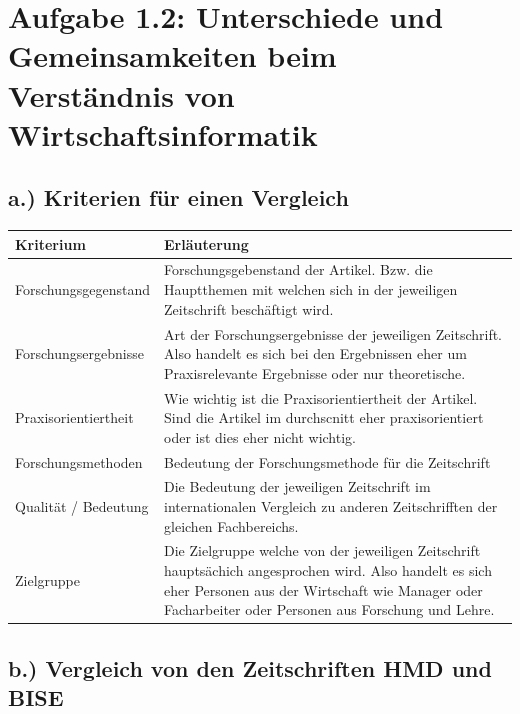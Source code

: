 \documentclass[12pt,utf8]{scrartcl}
\begin{document}
\section{\label{sec:einfuehrung}Aufgabe 1.2: Unterschiede und Gemeinsamkeiten beim Verständnis von Wirtschaftsinformatik}
\subsection{\label{sub:einfuehrung}a.) Kriterien für einen Vergleich}

\begin{tabular}{|p{5cm}|p{10cm}|}
\hline
Kriterium & Erläuterung \\
\hline
Forschungsgegenstand & Forschungsgebenstand der Artikel. Bzw. die Hauptthemen mit welchen sich in der jeweiligen Zeitschrift beschäftigt wird.\\
\hline
Forschungsergebnisse & Art der Forschungsergebnisse der jeweiligen Zeitschrift. Also handelt es sich bei den Ergebnissen eher um Praxisrelevante Ergebnisse oder nur theoretische. \\
\hline
Praxisorientiertheit & Wie wichtig ist die Praxisorientiertheit der Artikel. Sind die Artikel im durchscnitt eher praxisorientiert oder ist dies eher nicht wichtig.\\
\hline
Forschungsmethoden & Bedeutung der Forschungsmethode für die Zeitschrift\\
\hline
Qualität / Bedeutung & Die Bedeutung der jeweiligen Zeitschrift im internationalen Vergleich zu anderen Zeitschrifften der gleichen Fachbereichs.\\
\hline
Zielgruppe & Die Zielgruppe welche von der jeweiligen Zeitschrift hauptsächich angesprochen wird. Also handelt es sich eher Personen aus der Wirtschaft wie Manager oder Facharbeiter oder Personen aus Forschung und Lehre.\\
\hline
\end{tabular}

\newpage
\subsection{\label{sub2:einfuehrung}b.) Vergleich von den Zeitschriften HMD und BISE}
\end{document}
